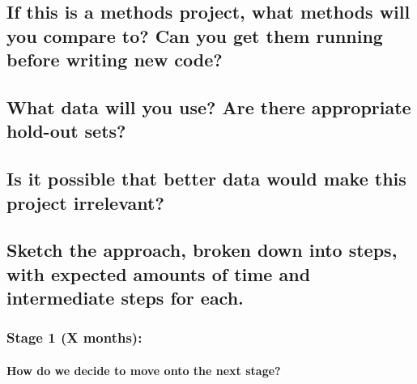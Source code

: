 \subsection{If this is a methods project, what methods will you compare to? Can you get them running before writing new code?}

\subsection{What data will you use? Are there appropriate hold-out sets?}

\subsection{Is it possible that better data would make this project irrelevant?}

\subsection{Sketch the approach, broken down into steps, with expected amounts of time and intermediate steps for each.}

\subsubsection{Stage 1 (X months):}

\paragraph{How do we decide to move onto the next stage?}
